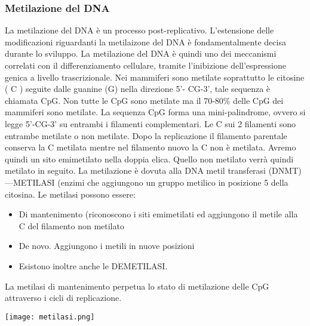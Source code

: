 \documentclass{article}
\begin{document}
\subsubsection{Metilazione del DNA}
La metilazione del DNA è un processo post-replicativo. L'estensione delle modificazioni riguardanti la metilaizone del DNA è fondamentalmente decisa durante lo sviluppo. La metilazione del DNA è quindi uno dei meccanismi correlati
con il differenziamento cellulare, tramite l'inibizione dell'espressione genica a livello trascrizionale. Nei mammiferi sono metilate soprattutto le citosine ( C ) seguite dalle guanine (G) nella direzione 5'-
CG-3', tale sequenza è chiamata CpG. Non tutte le CpG sono metilate ma il 70-80\% delle CpG dei mammiferi sono metilate.
La sequenza CpG forma una mini-palindrome, ovvero si legge 5'-CG-3' su
entrambi i filamenti complementari. Le C sui 2 filamenti sono entrambe
metilate o non metilate. Dopo la replicazione il filamento parentale conserva la C metilata
mentre nel filamento nuovo la C non è metilata. Avremo quindi
un sito emimetilato nella doppia elica. Quello non metilato verrà
quindi metilato in seguito. La metilazione è dovuta alla DNA metil transferasi
(DNMT) ---METILASI (enzimi che aggiungono un gruppo
metilico in posizione 5 della citosina. Le metilasi possono essere:
\begin{itemize}
    \item Di mantenimento (riconoscono i siti emimetilati ed
    aggiungono il metile alla C del filamento non metilato
    \item De novo. Aggiungono i metili in nuove posizioni
    \item Esistono inoltre anche le DEMETILASI.
\end{itemize}
La metilasi di mantenimento perpetua lo stato di metilazione delle CpG attraverso i cicli di replicazione.
\begin{center}
    \texttt{[image: metilasi.png]}
\end{center}
\end{document}
